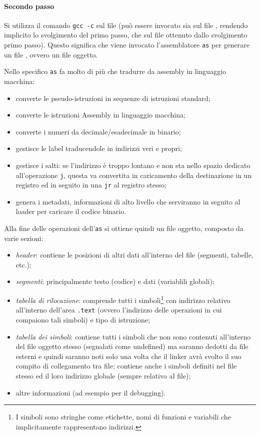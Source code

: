 \paragraph*{Secondo passo} Si utilizza il comando \texttt{gcc -c} sul file (può essere invocato sia sul file , rendendo implicito lo svolgimento del primo passo, che sul file  ottenuto dallo svolgimento primo passo). Questo significa che viene invocato l'assemblatore \texttt{as} per generare un file , ovvero un file oggetto.

Nello specifico \texttt{as} fa molto di più che tradurre da assembly in linguaggio macchina:
\begin{itemize}
	\item converte le pseudo-istruzioni in sequenze di istruzioni standard;
	\item converte le istruzioni Assembly in linguaggio macchina;
	\item converte i numeri da decimale/esadecimale in binario;
	\item gestisce le label traducendole in indirizzi veri e propri;
	\item gestisce i salti: se l'indirizzo è troppo lontano e non sta nello spazio dedicato all'operazione \texttt{j}, questa va convertita in caricamento della destinazione in un registro ed in seguito in una \texttt{jr} al registro stesso;
	\item genera i metadati, informazioni di alto livello che serviranno in seguito al loader per caricare il codice binario.
\end{itemize}
Alla fine delle operazioni dell'\texttt{as} si ottiene quindi un file oggetto, composto da varie sezioni:
\begin{itemize}
	\item \emph{header}: contiene le posizioni di altri dati all'interno del file (segmenti, tabelle, etc.);
	\item \emph{segmenti}: principalmente testo (codice) e dati (variablili globali);
	\item \emph{tabella di rilocazione}: comprende tutti i simboli\footnote{I simboli sono stringhe come etichette, nomi di funzioni e variabili che implicitamente rappresentano indirizzi.} con indirizzo relativo all'interno dell'area \texttt{.text} (ovvero l'indirizzo delle operazioni in cui compaiono tali simboli) e tipo di istruzione;
		\item \emph{tabella dei simboli}: contiene tutti i simboli che non sono contenuti all'interno del file oggetto stesso (segnalati come undefined) ma saranno dedotti da file esterni e quindi saranno noti solo una volta che il linker avrà svolto il suo compito di collegamento tra file; contiene anche i simboli definiti nel file stesso ed il loro indirizzo globale (sempre relativo al file);
	\item altre informazioni (ad esempio per il debugging).
\end{itemize}

